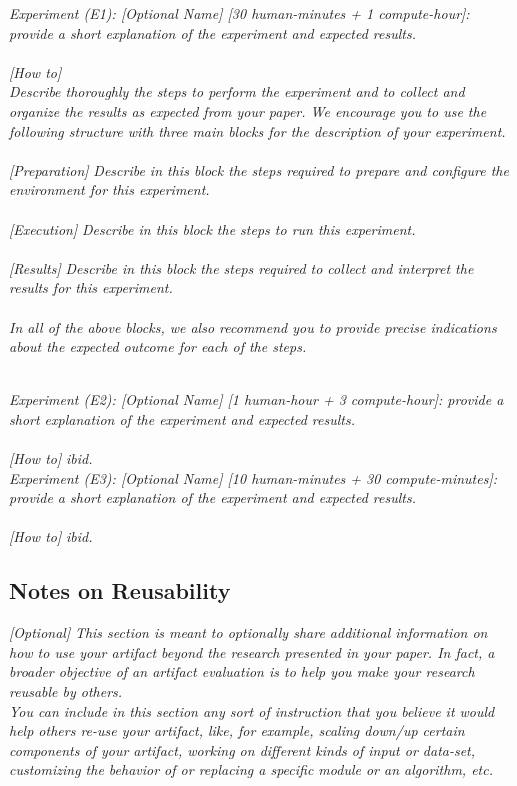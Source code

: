 \textit{Experiment (E1): [Optional Name] [30 human-minutes + 1 compute-hour]: provide a short explanation of the experiment and expected results.}\\\\
\textit{[How to]}\\
\textit{Describe thoroughly the steps to perform the experiment and to collect and organize the results as expected from your paper. We encourage you to use the following structure with three main blocks for the description of your experiment.} \\
~\\
\textit{[Preparation]}
\textit{Describe in this block the steps required to prepare and configure the environment for this experiment.}\\
~\\
\textit{[Execution]}
\textit{Describe in this block the steps to run this experiment.}\\
~\\
\textit{[Results]}
\textit{Describe in this block the steps required to collect and interpret the results for this experiment.}\\
~\\
\textit{In all of the above blocks, we also recommend you to provide precise indications about the expected outcome for each of the steps.}


~\\

\textit{Experiment (E2): [Optional Name] [1 human-hour + 3 compute-hour]: provide a short explanation of the experiment and expected results.}\\\\
\textit{[How to]} \textit{ibid.}
~\\

\textit{Experiment (E3): [Optional Name] [10 human-minutes + 30 compute-minutes]: provide a short explanation of the experiment and expected results.}\\\\
\textit{[How to]} \textit{ibid.}

\subsection{Notes on Reusability}
\label{sec:reuse}
{\em [Optional]}
\textit{This section is meant to optionally share additional information on how to use your artifact beyond the research presented in your paper. In fact, a broader objective of an artifact evaluation is to help you make your research reusable by others.\\
You can include in this section any sort of instruction that you believe it would help others re-use your artifact, like, for example, scaling down/up certain components of your artifact, working on different kinds of input or data-set, customizing the behavior of or replacing a specific module or an algorithm, etc.}

